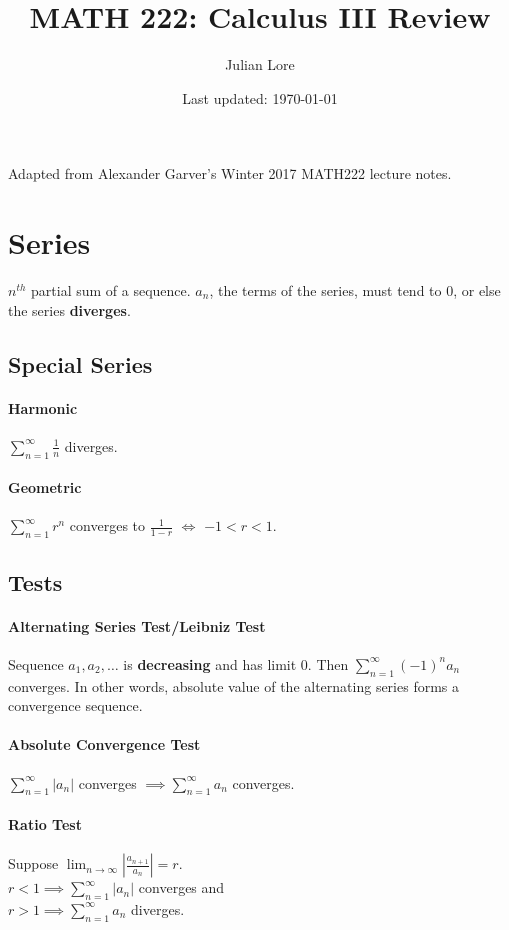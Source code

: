 \documentclass[12 pt]{article}
\author{Julian Lore}
\date{Last updated: \today}
\title{MATH 222: Calculus III Review}
\theoremstyle{definition}
\begin{document}
	\onehalfspacing
	\maketitle
	Adapted from Alexander Garver's Winter 2017 MATH222 lecture notes.
	\tableofcontents
	\newpage
	\section{Series}
	$n^{th}$ partial sum of a sequence. $a_n$, the terms of the series, must tend to $0$, or else the series \textbf{diverges}.
	\subsection{Special Series}
	\paragraph{Harmonic} $\sum_{n=1}^{\infty} \frac{1}{n}$ diverges.
	\paragraph{Geometric} $\sum_{n=1}^{\infty}r^n$ converges to $\frac{1}{1-r}$ $\iff$ $-1<r<1$.
	\subsection{Tests}
	\paragraph{Alternating Series Test/Leibniz Test}
	Sequence $a_1,a_2,\ldots$ is \textbf{decreasing} and has limit $0$. Then $\sum_{n=1}^{\infty}(-1)^n a_n$ converges. In other words, absolute value of the alternating series forms a convergence sequence.
	\paragraph{Absolute Convergence Test}
	$\sum_{n=1}^{\infty}|a_n|$ converges $\implies \sum_{n=1}^{\infty}a_n$ converges.
	\paragraph{Ratio Test} Suppose $\lim_{n\to \infty} \left|\frac{a_{n+1}}{a_n}\right|=r$. 
	\\$r<1 \implies \sum_{n=1}^{\infty}|a_n|$ converges and 
	\\$r>1 \implies \sum_{n=1}^{\infty}a_n$ diverges.
\end{document}
